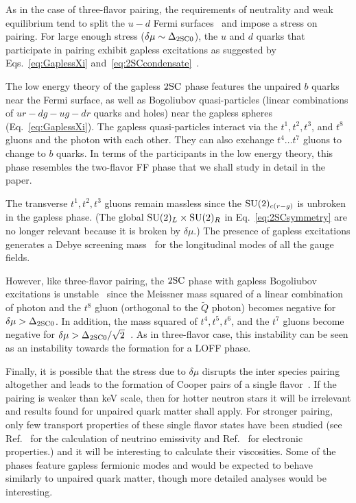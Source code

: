 \documentclass[10pt, aps, prd, superscriptaddress, nofootinbib, 
               amsmath, amssymb, twocolumn,
               preprintnumbers, showpacs,
               raggedbottom,
               floatfix]{revtex4-1}
\newcommand{\SU}{{\rm{SU}}}
\newcommand{\SC}{{\rm{SC}}}
\begin{document}
As in the case of three-flavor pairing, the requirements of neutrality and weak
equilibrium tend to split the $u-d$ Fermi surfaces~\cite{Shovkovy:2003uu} and
impose a stress on pairing. For large enough
stress ($\delta\mu\sim\Delta_{\rm{2SC}0}$), the $u$ and $d$ quarks that participate in
pairing exhibit gapless excitations as suggested by
Eqs.~\ref{eq:GaplessXi} and~\ref{eq:2SCcondensate}~\cite{Shovkovy:2003uu,Huang:2003xd}. 

The low energy theory of the gapless $2\SC$ phase features the unpaired $b$
quarks near the Fermi surface, as well as Bogoliubov quasi-particles (linear
combinations of $ur-dg-ug-dr$ quarks and holes) near the gapless spheres
(Eq.~\ref{eq:GaplessXi}). The gapless quasi-particles interact via the $t^1,
t^2, t^3$, and $t^8$ gluons and the photon with each other. They can also
exchange $t^4\dots t^7$ gluons to change to $b$ quarks.  In terms of the
participants in the low energy theory, this phase resembles the two-flavor FF
phase that we shall study in detail in the paper.

The transverse $t^1, t^2, t^3$ gluons remain massless since the
$\SU(2)_{c(r-g)}$ is unbroken in the gapless phase. (The global
$\SU(2)_L\times\SU(2)_R$ in Eq.~\ref{eq:2SCsymmetry} are no longer relevant
because it is broken by $\delta\mu$.) The presence of gapless excitations
generates a Debye screening mass~\cite{Huang:2004bg,Huang:2004am} for the
longitudinal modes of all the gauge fields. 

However, like three-flavor pairing, the $2{\rm{SC}}$ phase with gapless Bogoliubov excitations is
unstable~\cite{Huang:2004bg} since the Meissner mass squared of a linear
combination of photon and the $t^8$ gluon (orthogonal to the $\tilde{Q}$
photon) becomes negative for $\delta\mu>\Delta_{2\SC0}$. In addition, the mass
squared of $t^4, t^5, t^6$, and the $t^7$ gluons become negative for
$\delta\mu>\Delta_{2\SC0}/\sqrt{2}$~\cite{Huang:2004bg}. As in three-flavor
case, this instability can be seen as an instability towards the formation for
a LOFF phase.

Finally, it is possible that the stress due to $\delta\mu$ disrupts the 
inter species pairing altogether and leads to the formation of Cooper pairs of a
single flavor~\cite{Alford:2002rz,Schafer:2000cj,Buballa:2002wy,Schmitt:2004et}.  
If the pairing is weaker than keV scale, then for hotter neutron stars it
will be irrelevant and results found for unpaired quark matter shall apply. For
stronger pairing, only  few transport properties of these single flavor states have
been studied (see Ref.~\cite{Schmitt:2005wg} for the calculation of neutrino
emissivity and Ref.~\cite{Schmitt:2003xq} for electronic properties.) 
and it will be interesting to calculate their viscosities. Some of
the phases feature gapless fermionic modes and would be expected to behave
similarly to unpaired quark matter, though more detailed analyses would be
interesting.
\end{document}
